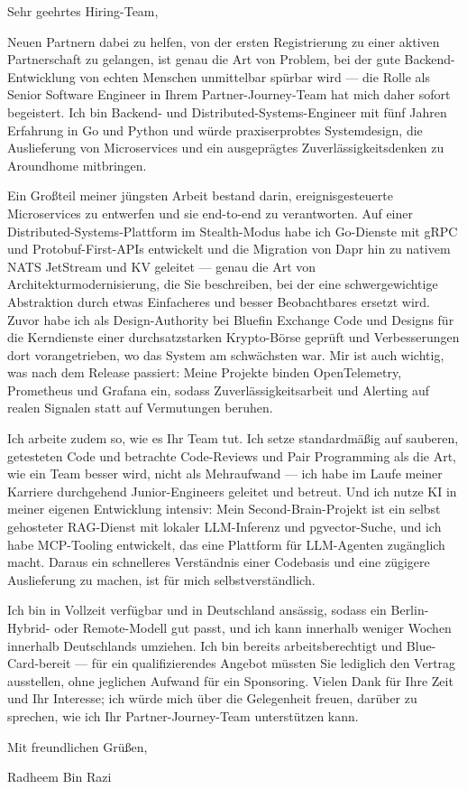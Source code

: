 \documentclass[11pt,a4paper]{coverletter}
\begin{document}
\clearpage
{}


\opening{Sehr geehrtes Hiring-Team,}

Neuen Partnern dabei zu helfen, von der ersten Registrierung zu einer aktiven Partnerschaft zu gelangen, ist genau die Art von Problem, bei der gute Backend-Entwicklung von echten Menschen unmittelbar spürbar wird — die Rolle als Senior Software Engineer in Ihrem Partner-Journey-Team hat mich daher sofort begeistert. Ich bin Backend- und Distributed-Systems-Engineer mit fünf Jahren Erfahrung in Go und Python und würde praxiserprobtes Systemdesign, die Auslieferung von Microservices und ein ausgeprägtes Zuverlässigkeitsdenken zu Aroundhome mitbringen.

Ein Großteil meiner jüngsten Arbeit bestand darin, ereignisgesteuerte Microservices zu entwerfen und sie end-to-end zu verantworten. Auf einer Distributed-Systems-Plattform im Stealth-Modus habe ich Go-Dienste mit gRPC und Protobuf-First-APIs entwickelt und die Migration von Dapr hin zu nativem NATS JetStream und KV geleitet — genau die Art von Architekturmodernisierung, die Sie beschreiben, bei der eine schwergewichtige Abstraktion durch etwas Einfacheres und besser Beobachtbares ersetzt wird. Zuvor habe ich als Design-Authority bei Bluefin Exchange Code und Designs für die Kerndienste einer durchsatzstarken Krypto-Börse geprüft und Verbesserungen dort vorangetrieben, wo das System am schwächsten war. Mir ist auch wichtig, was nach dem Release passiert: Meine Projekte binden OpenTelemetry, Prometheus und Grafana ein, sodass Zuverlässigkeitsarbeit und Alerting auf realen Signalen statt auf Vermutungen beruhen.

Ich arbeite zudem so, wie es Ihr Team tut. Ich setze standardmäßig auf sauberen, getesteten Code und betrachte Code-Reviews und Pair Programming als die Art, wie ein Team besser wird, nicht als Mehraufwand — ich habe im Laufe meiner Karriere durchgehend Junior-Engineers geleitet und betreut. Und ich nutze KI in meiner eigenen Entwicklung intensiv: Mein Second-Brain-Projekt ist ein selbst gehosteter RAG-Dienst mit lokaler LLM-Inferenz und pgvector-Suche, und ich habe MCP-Tooling entwickelt, das eine Plattform für LLM-Agenten zugänglich macht. Daraus ein schnelleres Verständnis einer Codebasis und eine zügigere Auslieferung zu machen, ist für mich selbstverständlich.

Ich bin in Vollzeit verfügbar und in Deutschland ansässig, sodass ein Berlin-Hybrid- oder Remote-Modell gut passt, und ich kann innerhalb weniger Wochen innerhalb Deutschlands umziehen. Ich bin bereits arbeitsberechtigt und Blue-Card-bereit — für ein qualifizierendes Angebot müssten Sie lediglich den Vertrag ausstellen, ohne jeglichen Aufwand für ein Sponsoring. Vielen Dank für Ihre Zeit und Ihr Interesse; ich würde mich über die Gelegenheit freuen, darüber zu sprechen, wie ich Ihr Partner-Journey-Team unterstützen kann.

\closing{Mit freundlichen Grüßen,}{Radheem Bin Razi}
\end{document}
